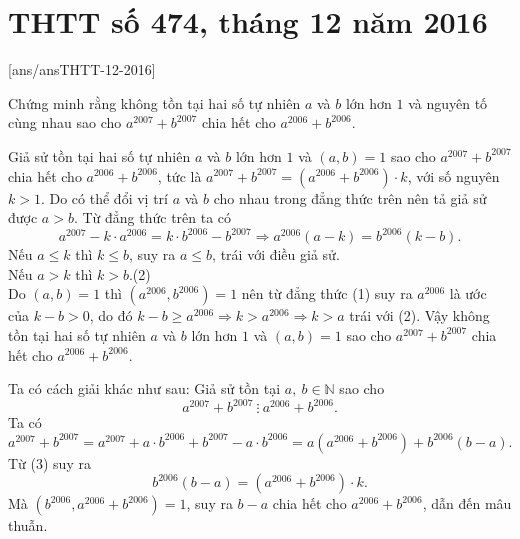 \section{THTT số 474, tháng 12 năm 2016}
[ans/ansTHTT-12-2016]

\begin{bt}%
	Chứng minh rằng không tồn tại hai số tự nhiên $a$ và $b$ lớn hơn $1$ và nguyên tố cùng nhau sao cho $a^{2007}+b^{2007}$ chia hết cho $a^{2006}+b^{2006}$.
	\loigiai
	{
		Giả sử tồn tại hai số tự nhiên $a$ và $b$ lớn hơn $1$ và $(a,b)=1$ sao cho $a^{2007}+b^{2007}$ chia hết cho $a^{2006}+b^{2006}$, tức là $a^{2007}+b^{2007}=\left(a^{2006}+b^{2006}\right)\cdot k$, với số nguyên $k>1$.
		Do có thể đổi vị trí $a$ và $b$ cho nhau trong đẳng thức trên nên tả giả sử được $a>b$. Từ đẳng thức trên ta có
		\[a^{2007}-k\cdot a^{2006}=k\cdot b^{2006}-b^{2007}\Rightarrow a^{2006}(a-k)=b^{2006}(k-b).\tag{1}\]
		Nếu $a\le k$ thì $k\le b$, suy ra $a\le b$, trái với điều giả sử.\\
		Nếu $a>k$ thì $k>b$.\hfill(2)\\
		Do $(a,b)=1$ thì $(a^{2006},b^{2006})=1$ nên từ đẳng thức (1) suy ra $a^{2006}$ là ước của $k-b>0$, do đó $k-b\ge a^{2006}\Rightarrow k>a^{2006}\Rightarrow k>a$ trái với (2).
		Vậy không tồn tại hai số tự nhiên $a$ và $b$ lớn hơn $1$ và $(a,b)=1$ sao cho $a^{2007}+b^{2007}$ chia hết cho $a^{2006}+b^{2006}$.
		\begin{nx} Ta có cách giải khác như sau: Giả sử tồn tại $a,~b\in\mathbb{N}$ sao cho $$a^{2007}+b^{2007}~\vdots~a^{2006}+b^{2006}.$$
Ta có \[a^{2007}+b^{2007}=a^{2007}+a\cdot b^{2006}+b^{2007}-a\cdot b^{2006}=a(a^{2006}+b^{2006})+b^{2006}(b-a).\tag{3}\]
			Từ (3) suy ra 
			\[b^{2006}(b-a)=(a^{2006}+b^{2006})\cdot k.\]
			Mà $(b^{2006},a^{2006}+b^{2006})=1$, suy ra $b-a$ chia hết cho $a^{2006}+b^{2006}$, dẫn đến mâu thuẫn.
		\end{nx}
	}
\end{bt}

